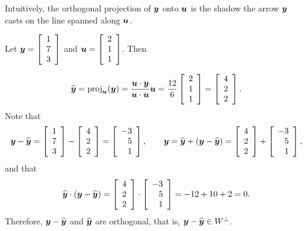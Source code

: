 \begin{multicols}{2}
Intuitively, the orthogonal projection of $\bb y$ onto $\bb u$ is the shadow the arrow $\bb y$ casts on the line spanned along $\bb u$.\\

\mbox{}\vspace{-0.25 in}
\begin{center}
\end{center}
\end{multicols}

\begin{Exam} Let $\bb y = \vr{1\\7\\3}$ and $\bb u = \vr{2\\1\\1}$. Then 

\[\widehat{\bb y} = \proj_{\bb u}(\bb y) = \dfrac{\bb u\cdot \bb y}{\bb u \cdot \bb u}\bb u = \dfrac{12}{6} \vr{2\\1\\1} =  \vr{4\\2\\2}.\] Note that \[\bb y - \widehat{\bb y} = \vr{1\\7\\3} - \vr{4\\2\\2} = \vr{-3\\5\\1},\qquad \bb y = \widehat{\bb y} + (\bb y - \widehat{\bb y}) = \vr{4\\2\\2} + \vr{-3\\5\\1},\] and that \[\widehat{\bb y} \cdot (\bb y - \widehat{\bb y}) = \vr{4\\2\\2}\cdot \vr{-3\\5\\1} = -12+10+2=0.\] Therefore, $\bb y - \widehat{\bb y}$ and $\widehat{\bb y}$ are orthogonal, that is, $\bb y - \widehat{\bb y}\in W^\perp$.
\end{Exam}\vs

